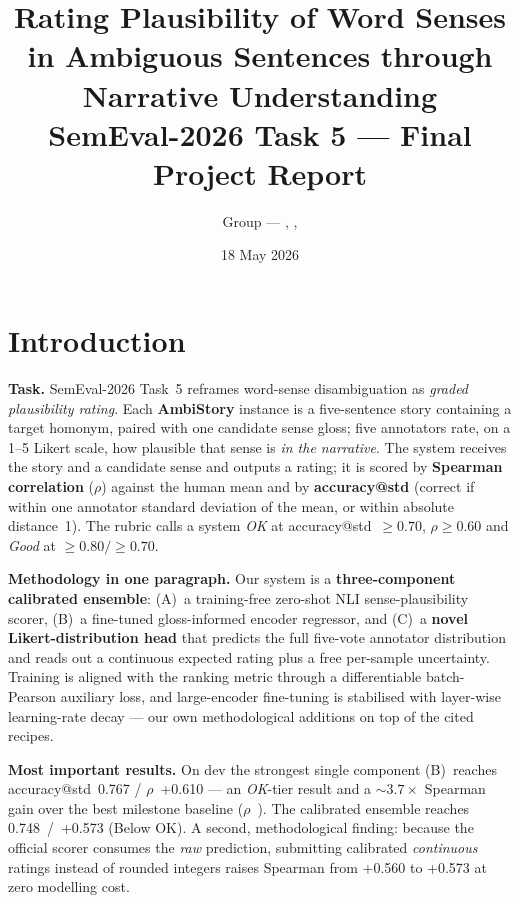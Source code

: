 \documentclass[11pt]{article}
\title{\textbf{Rating Plausibility of Word Senses in Ambiguous Sentences
through Narrative Understanding}\\[2pt]
\large SemEval-2026 Task 5 --- Final Project Report}
\author{Group \GROUP{} --- \MEMBERA{}, \MEMBERB{}, \MEMBERC{}}
\date{18 May 2026}
\newcommand{\Bacc}{0.767}\newcommand{\Brho}{+0.610}
\newcommand{\EnsAcc}{0.748}\newcommand{\EnsRho}{+0.573}
\newcommand{\EnsVerdict}{Below OK}              %
\newcommand{\AblIntRho}{+0.560}\newcommand{\AblContRho}{+0.573}
\begin{document}
\maketitle

\section{Introduction}
\textbf{Task.} SemEval-2026 Task~5 reframes word-sense disambiguation as
\emph{graded plausibility rating}. Each \textbf{AmbiStory} instance is a
five-sentence story containing a target homonym, paired with one candidate
sense gloss; five annotators rate, on a 1--5 Likert scale, how plausible that
sense is \emph{in the narrative}. The system receives the story and a
candidate sense and outputs a rating; it is scored by \textbf{Spearman
correlation} ($\rho$) against the human mean and by \textbf{accuracy@std}
(correct if within one annotator standard deviation of the mean, or within
absolute distance~1). The rubric calls a system \emph{OK} at
accuracy@std~$\ge0.70$, $\rho\ge0.60$ and \emph{Good} at $\ge0.80/\ge0.70$.

\textbf{Methodology in one paragraph.} Our system is a \textbf{three-component
calibrated ensemble}: (A)~a training-free zero-shot NLI sense-plausibility
scorer, (B)~a fine-tuned gloss-informed encoder regressor, and (C)~a
\textbf{novel Likert-distribution head} that predicts the full five-vote
annotator distribution and reads out a continuous expected rating plus a free
per-sample uncertainty. Training is aligned with the ranking metric through a
differentiable batch-Pearson auxiliary loss, and large-encoder fine-tuning is
stabilised with layer-wise learning-rate decay --- our own methodological
additions on top of the cited recipes.

\textbf{Most important results.} On dev the strongest single component
(B)~reaches accuracy@std~\Bacc{} / $\rho$~\Brho{} --- an \emph{OK}-tier
result and a $\sim$$3.7\times$ Spearman gain over the best milestone baseline
($\rho$~\blRidgeRho{}). The calibrated ensemble reaches \EnsAcc{}~/~\EnsRho{}
(\EnsVerdict). A second, methodological finding: because the official scorer
consumes the \emph{raw} prediction, submitting calibrated \emph{continuous}
ratings instead of rounded integers raises Spearman from \AblIntRho{} to
\AblContRho{} at zero modelling cost.

\end{document}
